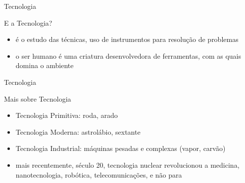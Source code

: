 \begin{frame}{Tecnologia}


\begin{block}{E a Tecnologia?}
\begin{itemize}
    \item é o estudo das técnicas, uso de instrumentos para resolução de problemas
    \item o ser humano é uma criatura desenvolvedora de ferramentas, com as quais domina o ambiente
\end{itemize}
\end{block}
    
\end{frame}

\begin{frame}{Tecnologia}

\begin{block}{Mais sobre Tecnologia}
\begin{itemize}
    \item Tecnologia Primitiva: roda, arado
    \item Tecnologia Moderna: astrolábio, sextante
    \item Tecnologia Industrial: máquinas pesadas e complexas (vapor, carvão)
    \item mais recentemente, século 20, tecnologia nuclear revolucionou a medicina, nanotecnologia, robótica, telecomunicações, e não para
\end{itemize}
\end{block}

\end{frame}

